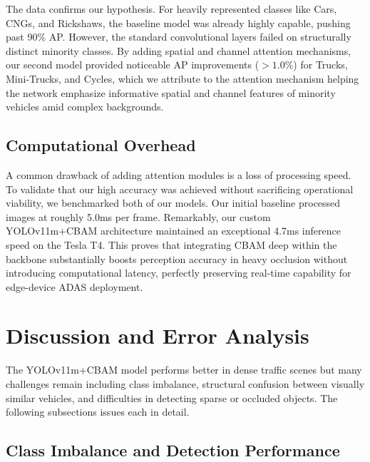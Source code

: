 \documentclass[sigconf]{acmart}
\begin{document}
The data confirms our hypothesis. For heavily represented classes like Cars, CNGs, and Rickshaws, the baseline model was already highly capable, pushing past 90\% AP. However, the standard convolutional layers failed on structurally distinct minority classes. By adding spatial and channel attention mechanisms, our second model provided noticeable AP improvements ($>1.0\%$) for Trucks, Mini-Trucks, and Cycles, which we attribute to the attention mechanism helping the network emphasize informative spatial and channel features of minority vehicles amid complex backgrounds.

\subsection{Computational Overhead}

A common drawback of adding attention modules is a loss of processing speed. To validate that our high accuracy was achieved without sacrificing operational viability, we benchmarked both of our models. Our initial baseline processed images at roughly 5.0ms per frame. Remarkably, our custom YOLOv11m+CBAM architecture maintained an exceptional 4.7ms inference speed on the Tesla T4. This proves that integrating CBAM deep within the backbone substantially boosts perception accuracy in heavy occlusion without introducing computational latency, perfectly preserving real-time capability for edge-device ADAS deployment.

\section{Discussion and Error Analysis}
The YOLOv11m+CBAM model performs better in dense traffic scenes but many challenges remain including class imbalance, structural confusion between visually similar vehicles, and difficulties in detecting sparse or occluded objects. The following subsections issues each in detail.

\subsection{Class Imbalance and Detection Performance}
\end{document}

